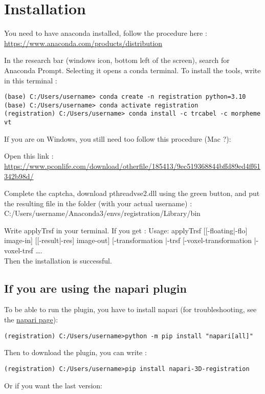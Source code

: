 \documentclass[11pt]{article}
\begin{document}
\section{Installation}
\begin{itemize}
\item[-] You need to have anaconda installed, follow the procedure here : \url{https://www.anaconda.com/products/distribution}
\item[-]In the research bar (windows icon, bottom left of the screen), search for Anaconda Prompt. Selecting it opens a conda terminal. To install the tools, write in this terminal :
\begin{verbatim}
(base) C:/Users/username> conda create -n registration python=3.10
(base) C:/Users/username> conda activate registration
(registration) C:/Users/username> conda install -c trcabel -c morpheme vt
\end{verbatim}

If you are on Windows, you still need too follow this procedure (Mac ?):
\begin{sloppypar}
\item[-]Open this link : \url{https://www.pconlife.com/download/otherfile/185413/9ec519368844bffd89ed4ff61342b98d/}
\end{sloppypar}
\begin{sloppypar}
Complete the captcha, download pthreadvse2.dll using the green button, and put the resulting file in the folder (with your actual username) : C:/Users/username/Anaconda3/envs/registration/Library/bin \\
\end{sloppypar}
\item[-]Write applyTrsf in your terminal. If you get :
Usage: applyTrsf [[-floating|-flo] image-in] [[-result|-res] image-out]
 [-transformation |-trsf %
 [-voxel-transformation |-voxel-trsf %
…. \\
Then the installation is successful.


\subsection{If you are using the napari plugin}

To be able to run the plugin, you have to install napari (for troubleshooting, see the \href{https:/napari.org/stable/}{napari page}):

\begin{verbatim}
(registration) C:/Users/username>python -m pip install "napari[all]"
\end{verbatim}
Then to download the plugin, you can write :
\begin{verbatim}
(registration) C:/Users/username>pip install napari-3D-registration
\end{verbatim}
Or if you want the last version:


\end{itemize}
\end{document}
